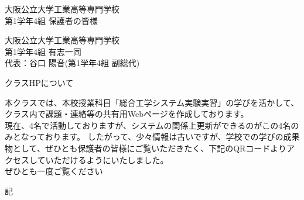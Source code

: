 \documentclass{ltjsarticle}
\begin{document}
\begin{flushleft}
    大阪公立大学工業高等専門学校\\
    第1学年4組 保護者の皆様
\end{flushleft}
\begin{flushright}
    大阪公立大学工業高等専門学校\\
    第1学年4組 有志一同\\
    代表：谷口 陽音(第1学年4組 副総代)
\end{flushright}
\begin{Large}
    クラスHPについて
\end{Large}
本クラスでは、本校授業科目「総合工学システム実験実習」の学びを活かして、
クラス内で課題・連絡等の共有用Webページを作成しております。\\
現在、4名で活動しておりますが、システムの関係上更新ができるのがこの4名のみとなっております。
したがって、少々情報は古いですが、学校での学びの成果物として、ぜひとも保護者の皆様にご覧いただきたく、下記のQRコードよりアクセスしていただけるようにいたしました。\\
ぜひとも一度ご覧ください

\begin{center}
    記
\end{center}
\end{document}
